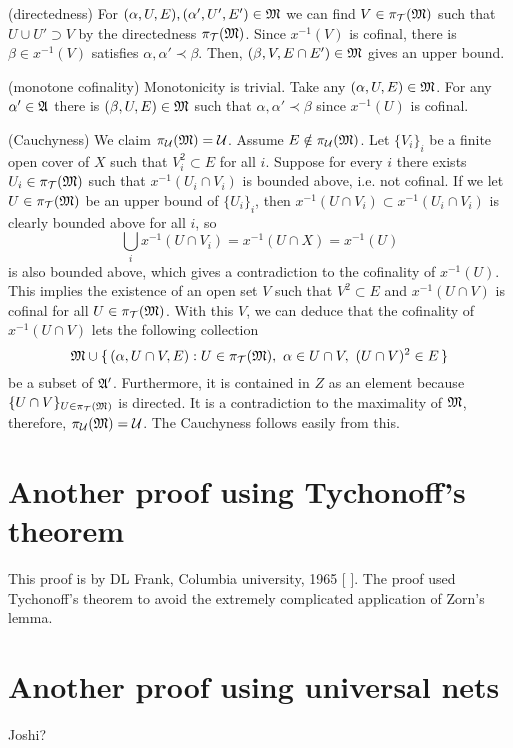 \documentclass{../exp}
\begin{document}
\begin{pf}[1 of Theorem 1.1]
(directedness)
For $(\alpha,U,E),(\alpha',U',E')\in\mathfrak{M}$ we can find $V\in\pi_{\mathcal{T}}(\mathfrak{M})$ such that $U\cup U'\supset V$ by the directedness $\pi_{\mathcal{T}}(\mathfrak{M})$.
Since $x^{-1}(V)$ is cofinal, there is $\beta\in x^{-1}(V)$ satisfies $\alpha,\alpha'\prec\beta$.
Then, $(\beta,V,E\cap E')\in\mathfrak{M}$ gives an upper bound.

(monotone cofinality)
Monotonicity is trivial.
Take any $(\alpha,U,E)\in\mathfrak{M}$.
For any $\alpha'\in\mathfrak{A}$ there is $(\beta,U,E)\in\mathfrak{M}$ such that $\alpha,\alpha'\prec\beta$ since $x^{-1}(U)$ is cofinal.

(Cauchyness)
We claim $\pi_{\mathcal{U}}(\mathfrak{M})=\mathcal{U}$.
Assume $E\notin\pi_{\mathcal{U}}(\mathfrak{M})$.
Let $\{V_i\}_i$ be a finite open cover of $X$ such that $V_i^2\subset E$ for all $i$.
Suppose for every $i$ there exists $U_i\in\pi_{\mathcal{T}}(\mathfrak{M})$ such that $x^{-1}(U_i\cap V_i)$ is bounded above, i.e. not cofinal.
If we let $U\in\pi_{\mathcal{T}}(\mathfrak{M})$ be an upper bound of $\{U_i\}_i$, then $x^{-1}(U\cap V_i)\subset x^{-1}(U_i\cap V_i)$ is clearly bounded above for all $i$, so
\[\bigcup_ix^{-1}(U\cap V_i)=x^{-1}(U\cap X)=x^{-1}(U)\]
is also bounded above, which gives a contradiction to the cofinality of $x^{-1}(U)$.
This implies the existence of an open set $V$ such that $V^2\subset E$ and $x^{-1}(U\cap V)$ is cofinal for all $U\in\pi_{\mathcal{T}}(\mathfrak{M})$.
With this $V$, we can deduce that the cofinality of $x^{-1}(U\cap V)$ lets the following collection
\[\fM\cup\{\,(\alpha,U\cap V,E):U\in\pi_\cT(\fM),\ \alpha\in U\cap V,\ (U\cap V)^2\in E\,\}\]
be a subset of $\mathfrak{A}'$.
Furthermore, it is contained in $Z$ as an element because $\{U\cap V\}_{U\in\pi_{\mathcal{T}}(\mathfrak{M})}$ is directed.
It is a contradiction to the maximality of $\mathfrak{M}$, therefore, $\pi_{\mathcal{U}}(\mathfrak{M})=\mathcal{U}$.
The Cauchyness follows easily from this.
\end{pf}







\section{Another proof using Tychonoff's theorem}
This proof is by DL Frank, Columbia university, 1965 [ ].
The proof used Tychonoff's theorem to avoid the extremely complicated application of Zorn's lemma.

\begin{pf}[2 of Theorem 1.1]

\end{pf}


\section{Another proof using universal nets}
Joshi?
\end{document}
